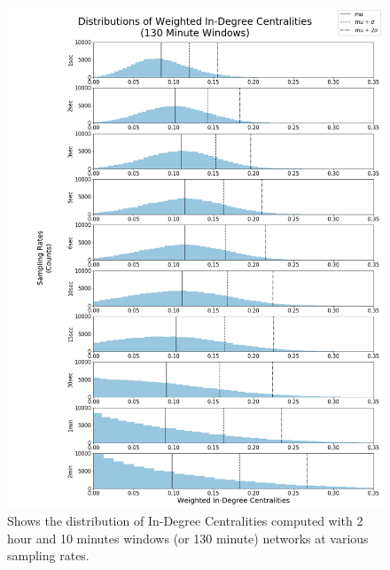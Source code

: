 \begin{figure}[!htb]
  \centerline{\includegraphics[scale=0.42]{figures/PredIF/130MinDist-InDeg.png}}
  \caption{Shows the distribution of In-Degree Centralities computed with 2 hour and 10 minutes windows (or 130 minute) networks at various sampling rates.}
  \label{fig:130MinDist-InDeg}
\end{figure}

